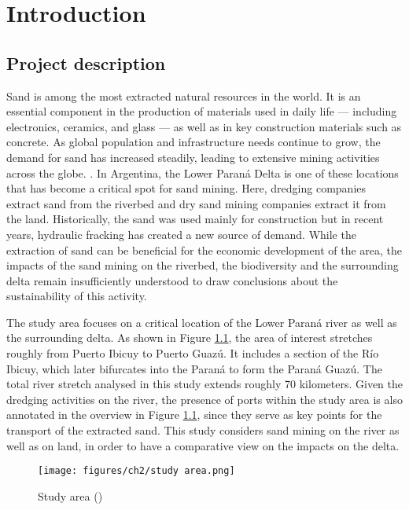 \chapter{Introduction}
\label{chapter:introduction}

\section{Project description}
Sand is among the most extracted natural resources in the world. It is an essential component in the production of materials used in daily life — including electronics, ceramics, and glass — as well as in key construction materials such as concrete. As global population and infrastructure needs continue to grow, the demand for sand has increased steadily, leading to extensive mining activities across the globe. \autocite{wwfRisingDemandSand}. 
In Argentina, the Lower Paraná Delta is one of these locations that has become a critical spot for sand mining. Here, dredging companies extract  sand from the riverbed and dry sand mining companies extract it from the land. Historically, the sand was used mainly for construction but in recent years, hydraulic fracking has created a new source of demand.
While the extraction of sand can be beneficial for the economic development of the area, the impacts of the sand mining on the riverbed, the biodiversity and the surrounding delta remain insufficiently understood to draw conclusions about the sustainability of this activity. 
 
The study area focuses on a critical location of the Lower Paraná river as well as the surrounding delta. As shown in Figure \ref{fig:study area}, the area of interest stretches roughly from Puerto Ibicuy to Puerto Guazú. It includes a section of the Río Ibicuy, which later bifurcates into the Paraná to form the Paraná Guazú. The total river stretch analysed in this study extends roughly 70 kilometers. Given the dredging activities on the river, the presence of ports within the study area is also annotated in the overview in Figure \ref{fig:study area}, since they serve as key points for the transport of the extracted sand. This study considers sand mining on the river as well as on land, in order to have a comparative view on the impacts on the delta.

\begin{figure}[H]
    \centering    \texttt{[image: figures/ch2/study area.png]}
    \caption{Study area (\cite{GoogleEarth})}
    \label{fig:study area}
\end{figure}

